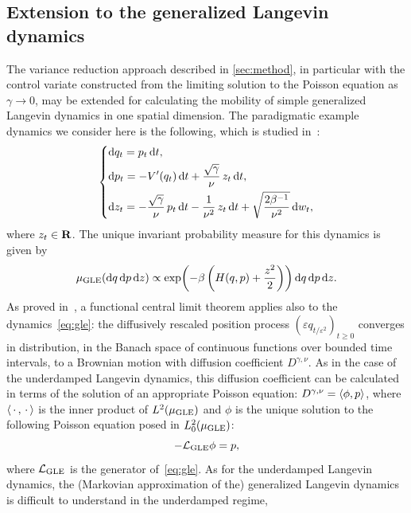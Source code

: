 \documentclass[11pt,a4paper]{article}
\begin{document}
\subsection{Extension to the generalized Langevin dynamics}%
\label{sub:generalization_to_generalized_langevin_dynamics}
The variance reduction approach described in \cref{sec:method},
in particular with the control variate constructed from the limiting solution to the Poisson equation as $\gamma \to 0$,
may be extended for calculating the mobility of simple generalized Langevin dynamics in one spatial dimension.
The paradigmatic example dynamics we consider here is the following,
which is studied in~\cite{MR2793823,GPGSUV21}:
\begin{equation}
\label{eq:gle}
\left\{
  \begin{aligned}
      & \mathrm d q_t = p_t \, \mathrm d t, \\
      & \mathrm d p_t = - V'(q_t) \, \mathrm d t + \frac{\sqrt{\gamma}}{\nu} \, z_t \, \mathrm d t, \\
      & \mathrm d z_t = - \frac{\sqrt{\gamma}}{\nu} \, p_t  \, \mathrm d t
      -   \frac{1}{\nu^2} \, z_t \, \mathrm d t + \sqrt{\frac{2 \beta^{-1}}{\nu^2}} \, \mathrm d w_t,
  \end{aligned}
\right.
\end{equation}
where $z_t \in \mathbf R$.
The unique invariant probability measure for this dynamics is given by
\[
    \mu_{\rm GLE}(\mathrm d q \, \mathrm d p \, \mathrm d z) \propto \exp \biggl( - \beta \left( H(q,p) + \frac{z^2}{2} \right) \biggr) \, \mathrm d q \, \mathrm d p \, \mathrm d z.
\]
As proved in~\cite{ottobre2012asymptotic},
a functional central limit theorem applies also to the dynamics~\eqref{eq:gle}:
the diffusively rescaled position process $(\varepsilon q_{t/\varepsilon^2})_{t \geq 0}$ converges in distribution,
in the Banach space of continuous functions over bounded time intervals,
to a Brownian motion with diffusion coefficient $ D^{\gamma, \nu}$.
As in the case of the underdamped Langevin dynamics, this diffusion coefficient can be calculated in terms of the solution of an appropriate Poisson equation: $  D^{\gamma, \nu} = \ip{\phi}{p}$, where $\ip{\dummy}{\dummy}$ is the inner product of $L^2(\mu_{\rm GLE})$
and $\phi$ is the unique solution to the following Poisson equation posed in $L^2_0(\mu_{\rm GLE})$:
\begin{equation}
    \label{eq:poisson_gle}
    - \mathcal L_{\rm GLE} \phi = p,
\end{equation}
where $\mathcal L_{\rm GLE}$ is the generator of~\eqref{eq:gle}.
As for the underdamped Langevin dynamics, the (Markovian approximation of the) generalized Langevin dynamics is difficult to understand in the underdamped regime,
\end{document}
